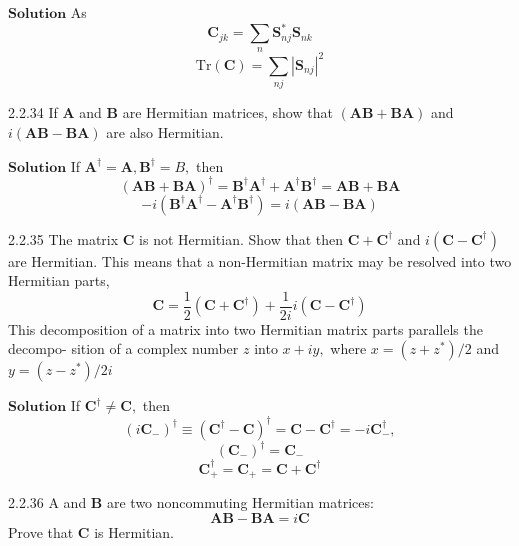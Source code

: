 \documentclass{styles/kaobook}
\begin{document}
$\boxed{\textbf{Solution}}$ As
$$\mathbf{C}_{j k}=\sum_{n} \boldsymbol{S}_{n j}^{*} \boldsymbol{S}_{n k}$$
$$\text{Tr}(\mathbf{C})=\sum_{n j}\left|\boldsymbol{S}_{n j}\right|^{2}$$



\begin{greenbox}{2.2.34}
If $\mathbf{A}$ and $\mathbf{B}$ are Hermitian matrices, show that $(\mathbf{A}\mathbf{B}+\mathbf{BA})$ and $i(\mathbf{A}\mathbf{B}-\mathbf{B}\mathbf{A})$ are also Hermitian.
\end{greenbox}

$\boxed{\textbf{Solution}}$  If $\mathbf{A}^{\dagger}=\mathbf{A}, \mathbf{B}^{\dagger}=B,$ then
$$(\mathbf{A}\mathbf{B}+\mathbf{BA})^{\dagger}=\mathbf{B}^{\dagger} \mathbf{A}^{\dagger}+\mathbf{A}^{\dagger} \mathbf{B}^{\dagger}=\mathbf{AB}+\mathbf{BA}$$
$$-i\left(\mathbf{B}^{\dagger} \mathbf{A}^{\dagger}-\mathbf{A}^{\dagger} \mathbf{B}^{\dagger}\right)=i(\mathbf{A}\mathbf{B}-\mathbf{B}\mathbf{A})$$







\begin{greenbox}{2.2.35}
The matrix $\mathbf{C}$ is not Hermitian. Show that then $\mathbf{C}+\mathbf{C}^{\dagger}$ and $i\left(\mathbf{C}-\mathbf{C}^{\dagger}\right)$ are Hermitian.
This means that a non-Hermitian matrix may be resolved into two Hermitian parts,
$$
\mathbf{C}=\frac{1}{2}\left(\mathbf{C}+\mathbf{C}^{\dagger}\right)+\frac{1}{2 i} i\left(\mathbf{C}-\mathbf{C}^{\dagger}\right)
$$
This decomposition of a matrix into two Hermitian matrix parts parallels the decompo-
sition of a complex number $z$ into $x+i y,$ where $x=\left(z+z^{*}\right) / 2$ and $y=\left(z-z^{*}\right) / 2 i$
\end{greenbox}


$\boxed{\textbf{Solution}}$ If $\mathbf{C}^{\dagger} \neq \mathbf{C},$ then 
$$\left(i \mathbf{C}_{-}\right)^{\dagger} \equiv\left(\mathbf{C}^{\dagger}-\mathbf{C}\right)^{\dagger}=\mathbf{C}-\mathbf{C}^{\dagger}=-i \mathbf{C}_{-}^{\dagger},$$
$$\left(\mathbf{C}_{-}\right)^{\dagger}=\mathbf{C}_{-}$$
$$\mathbf{C}_{+}^{\dagger}=\mathbf{C}_{+}=\mathbf{C}+\mathbf{C}^{\dagger}$$




\begin{greenbox}{2.2.36}
A and $\mathbf{B}$ are two noncommuting Hermitian matrices:
$$
\mathbf{AB}-\mathbf{B}\mathbf{A}=i \mathbf{C}
$$
Prove that $\mathbf{C}$ is Hermitian.
\end{greenbox}
\end{document}

